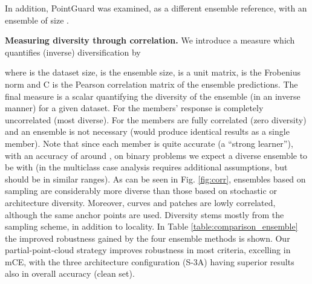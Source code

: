 \documentclass[10pt,twocolumn]{article}
\begin{document}
In addition, PointGuard \cite{pointguard} was examined, as a different ensemble reference, with an ensemble of size .


\textbf{Measuring diversity through correlation.} 
We introduce a measure which quantifies (inverse) diversification by 

where  is the dataset size,  is the ensemble size,  is a unit matrix,  is the Frobenius norm and C is the Pearson correlation matrix of the ensemble predictions.
The final measure  is a scalar quantifying the diversity of the ensemble (in an inverse manner) for a given dataset.
For  the members' response is completely uncorrelated (most diverse). For  the members are fully correlated (zero diversity) and an ensemble is not necessary (would produce identical results as a single member). Note that since each member is quite accurate (a ``strong learner''), with an accuracy of around , on binary problems we expect a diverse ensemble to be with  (in the multiclass case analysis requires additional assumptions, but should be in similar ranges).   
As can be seen in Fig. \ref{fig:corr}, ensembles based on sampling are considerably more diverse than those based on stochastic or architecture diversity. Moreover, curves and patches are lowly correlated, although the same anchor points are used. Diversity stems mostly from the sampling scheme, in addition to locality.
In Table \ref{table:comparison_ensemble} the improved robustness gained by the four ensemble methods is shown. Our partial-point-cloud strategy improves robustness in most criteria, excelling in mCE, with the three architecture configuration (S-3A) having superior results also in overall accuracy (clean set).
\end{document}

